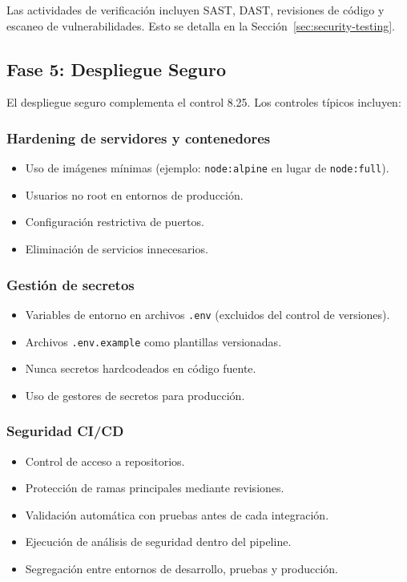 Las actividades de verificación incluyen SAST, DAST, revisiones de código y escaneo de vulnerabilidades. Esto se detalla en la Sección~\ref{sec:security-testing}.

\subsection{Fase 5: Despliegue Seguro}

El despliegue seguro complementa el control 8.25. Los controles típicos incluyen:

\subsubsection{Hardening de servidores y contenedores}
\begin{itemize}
    \item Uso de imágenes mínimas (ejemplo: \texttt{node:alpine} en lugar de \texttt{node:full}).
    \item Usuarios no root en entornos de producción.
    \item Configuración restrictiva de puertos.
    \item Eliminación de servicios innecesarios.
\end{itemize}

\subsubsection{Gestión de secretos}
\begin{itemize}
    \item Variables de entorno en archivos \texttt{.env} (excluidos del control de versiones).
    \item Archivos \texttt{.env.example} como plantillas versionadas.
    \item Nunca secretos hardcodeados en código fuente.
    \item Uso de gestores de secretos para producción.
\end{itemize}

\subsubsection{Seguridad CI/CD}
\begin{itemize}
    \item Control de acceso a repositorios.
    \item Protección de ramas principales mediante revisiones.
    \item Validación automática con pruebas antes de cada integración.
    \item Ejecución de análisis de seguridad dentro del pipeline.
    \item Segregación entre entornos de desarrollo, pruebas y producción.
\end{itemize}

